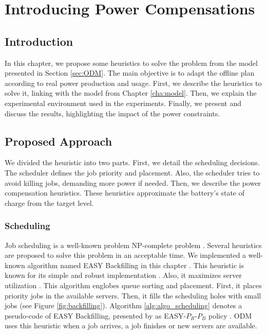 \chapter{Introducing Power Compensations}
\label{cha:power_compensations}

\minitoc

\section{Introduction}

In this chapter, we propose some heuristics to solve the problem from the model presented in Section \ref{sec:ODM}. The main objective is to adapt the offline plan according to real power production and usage. First, we describe the heuristics to solve it, linking with the model from Chapter \ref{cha:model}. Then, we explain the experimental environment used in the experiments. Finally, we present and discuss the results, highlighting the impact of the power constraints.

\section{Proposed Approach}

We divided the heuristic into two parts. First, we detail the scheduling decisions. The scheduler defines the job priority and placement. Also, the scheduler tries to avoid killing jobs, demanding more power if needed. Then, we describe the power compensation heuristics. These heuristics approximate the battery's state of charge from the target level.

\subsection{Scheduling}
\label{sec:heuristic_scheduling}

Job scheduling is a well-known problem NP-complete problem \cite{robert2009introduction, agrawal2021energy}. Several heuristics are proposed to solve this problem in an acceptable time. We implemented a well-known algorithm named EASY Backfilling in this chapter \cite{mu2001utilization}. This heuristic is known for its simple and robust implementation \cite{srinivasan2002characterization}. Also, it maximizes server utilization \cite{srinivasan2002characterization}. This algorithm englobes queue sorting and placement. First, it places priority jobs in the available servers. Then, it fills the scheduling holes with small jobs (see Figure \ref{fig:backfilling}). Algorithm \ref{alg:algo_scheduling} denotes a pseudo-code of EASY Backfilling, presented by \citeauthor{lelong2018tuning} as EASY-$P_{R}$-$P_{B}$ policy \cite{lelong2018tuning}. ODM uses this heuristic when a job arrives, a job finishes or new servers are available. 

